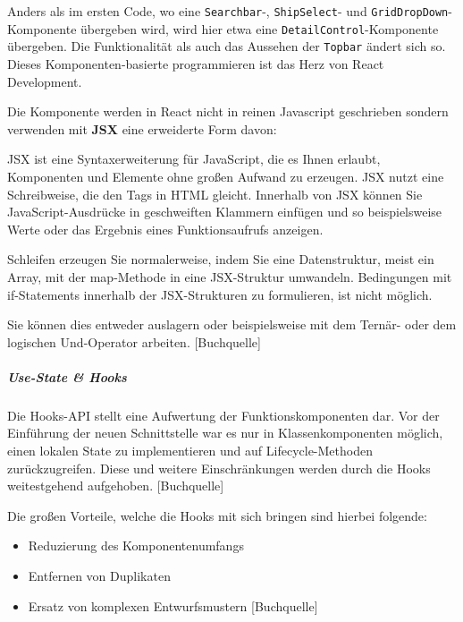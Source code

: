 \documentclass[
    headings=optiontotocandhead,%
    twoside,
    numbers=noenddot,%
    12pt, %
    titlepage, %
    parskip=full, %
    listof=leveldown, 
    numbers=noenddot, %
    a4paper,DIV=14,
    BCOR=15mm,
]{scrbook}
\newcommand{\passthrough}[1]{#1}
\renewenvironment{quote}{\begin{customblockquote}\list{}{\rightmargin=0em\leftmargin=0em}%
\item\relax\color{blockquote-text}\ignorespaces}{\unskip\unskip\endlist\end{customblockquote}}
\providecommand{\tightlist}{%
  \setlength{\itemsep}{0pt}\setlength{\parskip}{0pt}}
\begin{document}
Anders als im ersten Code, wo eine \passthrough{\lstinline!Searchbar!}-,
\passthrough{\lstinline!ShipSelect!}- und
\passthrough{\lstinline!GridDropDown!}-Komponente übergeben wird, wird
hier etwa eine \passthrough{\lstinline!DetailControl!}-Komponente
übergeben. Die Funktionalität als auch das Aussehen der
\passthrough{\lstinline!Topbar!} ändert sich so. Dieses
Komponenten-basierte programmieren ist das Herz von React Development.

Die Komponente werden in React nicht in reinen Javascript geschrieben
sondern verwenden mit \textbf{JSX} eine erweiderte Form davon:

\begin{quote}
JSX ist eine Syntaxerweiterung für JavaScript, die es Ihnen erlaubt,
Komponenten und Elemente ohne großen Aufwand zu erzeugen. JSX nutzt eine
Schreibweise, die den Tags in HTML gleicht. Innerhalb von JSX können Sie
JavaScript-Ausdrücke in geschweiften Klammern einfügen und so
beispielsweise Werte oder das Ergebnis eines Funktionsaufrufs anzeigen.
\end{quote}

Schleifen erzeugen Sie normalerweise, indem Sie eine Datenstruktur,
meist ein Array, mit der map-Methode in eine JSX-Struktur umwandeln.
Bedingungen mit if-Statements innerhalb der JSX-Strukturen zu
formulieren, ist nicht möglich.

Sie können dies entweder auslagern oder beispielsweise mit dem Ternär-
oder dem logischen Und-Operator arbeiten. {[}Buchquelle{]}

\hypertarget{use-state-hooks}{%
\subparagraph{Use-State \& Hooks}\label{use-state-hooks}}

\begin{quote}
Die Hooks-API stellt eine Aufwertung der Funktionskomponenten dar. Vor
der Einführung der neuen Schnittstelle war es nur in Klassenkomponenten
möglich, einen lokalen State zu implementieren und auf
Lifecycle-Methoden zurückzugreifen. Diese und weitere Einschränkungen
werden durch die Hooks weitestgehend aufgehoben. {[}Buchquelle{]}
\end{quote}

Die großen Vorteile, welche die Hooks mit sich bringen sind hierbei
folgende:

\begin{itemize}
\tightlist
\item
  Reduzierung des Komponentenumfangs
\item
  Entfernen von Duplikaten
\item
  Ersatz von komplexen Entwurfsmustern {[}Buchquelle{]}
\end{itemize}
\end{document}
